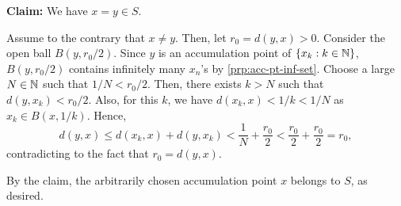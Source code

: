\begin{enumerate}
\begin{pf}
\textbf{Claim:} We have \(x=y\in S\).

\begin{pf}
Assume to the contrary that \(x\ne y\). Then, let \(r_0=d(y,x)>0\). Consider
the open ball \(B(y,r_0/2)\). Since \(y\) is an accumulation point of
\(\{x_k:k\in\mathbb{N}\}\), \(B(y,r_0/2)\) contains infinitely many \(x_n\)'s by
\cref{prp:acc-pt-inf-set}. Choose a large \(N\in\mathbb{N}\) such that \(1/N<r_0/2\).
Then, there exists \(k>N\) such that \(d(y,x_k)<r_0/2\). Also, for this \(k\),
we have \(d(x_k,x)<1/k<1/N\) as \(x_k\in B(x,1/k)\). Hence,
\[
d(y,x)\le d(x_k,x)+d(y,x_k)
<\frac{1}{N}+\frac{r_0}{2}
<\frac{r_0}{2}+\frac{r_0}{2}
=r_0,
\]
contradicting to the fact that \(r_0=d(y,x)\).
\end{pf}

By the claim, the arbitrarily chosen accumulation point \(x\) belongs to \(S\),
as desired.
\end{pf}
\end{enumerate}
